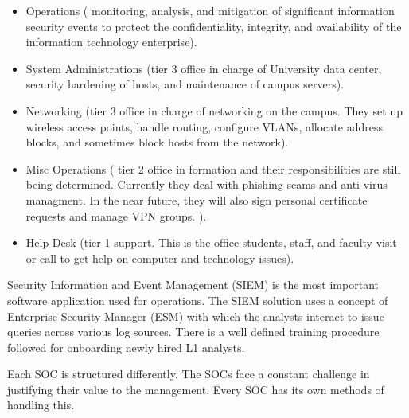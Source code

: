 \documentclass[14pt]{article}
\begin{document}
		\begin{itemize}
		\item Operations ( monitoring, analysis, and mitigation of signiﬁcant information security events to protect the conﬁdentiality, integrity, and availability of the information technology enterprise).
		\item System Administrations (tier 3 oﬃce in charge of University data center, security hardening of hosts, and maintenance of campus servers).
		\item Networking (tier 3 oﬃce in charge of networking on the campus. They set up wireless access points, handle routing, conﬁgure VLANs, allocate address blocks, and sometimes block hosts from the network).
		\item Misc Operations ( tier 2 oﬃce in formation and their responsibilities are still being determined. Currently they deal with phishing scams and anti-virus managment. In the near future, they will also sign personal certiﬁcate requests and manage VPN groups. ).
		\item Help Desk (tier 1 support. This is the oﬃce students, staﬀ, and faculty visit or call to get help on computer and technology issues).
		\end{itemize}
	
	Security Information and Event Management (SIEM) is the most important software application used for operations. The SIEM solution uses a concept of Enterprise Security Manager (ESM) with which the analysts interact to issue queries across various log sources. There is a well deﬁned training procedure followed for onboarding newly hired L1 analysts. 

	Each SOC is structured diﬀerently. The SOCs face a constant challenge in justifying their value to the management. Every SOC has its own methods of handling this.
\end{document}
